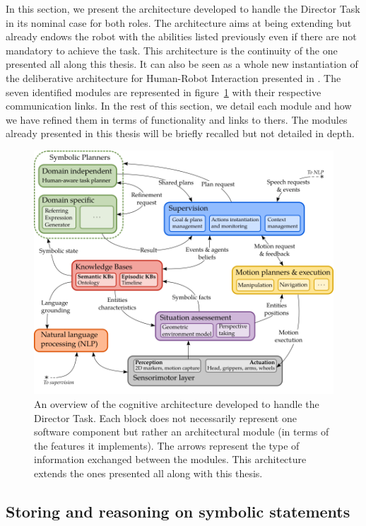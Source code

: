In this section, we present the architecture developed to handle the Director Task in its nominal case for both roles. The architecture aims at being extending but already endows the robot with the abilities listed previously even if there are not mandatory to achieve the task. This architecture is the continuity of the one presented all along this thesis. It can also be seen as a whole new instantiation of the deliberative architecture for Human-Robot Interaction presented in \cite{lemaignan_2017_artificial}. The seven identified modules are represented in figure~\ref{fig:chap9_architecture} with their respective communication links. In the rest of this section, we detail each module and how we have refined them in terms of functionality and links to thers. The modules already presented in this thesis will be briefly recalled but not detailed in depth.

\begin{figure}[ht!]
\centering
\includegraphics[width=\textwidth]{figures/chapter9/architecture.png}
\caption{\label{fig:chap9_architecture} An overview of the cognitive architecture developed to handle the Director Task. Each block does not necessarily represent one software component but rather an architectural module (in terms of the features it implements). The arrows represent the type of information exchanged between the modules. This architecture extends the ones presented all along with this thesis.}
\end{figure}

\subsection{Storing and reasoning on symbolic statements}

